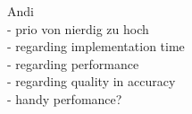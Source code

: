  Andi \\
- prio von nierdig zu hoch \\
- regarding implementation time \\
- regarding performance \\
- regarding quality in accuracy \\
- handy perfomance? \\

